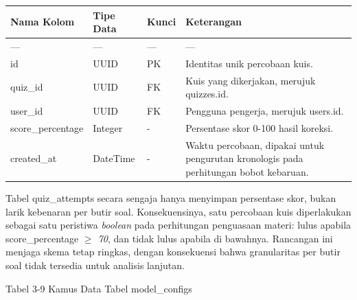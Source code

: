 \documentclass[12pt,a4paper]{article}
\begin{document}
\begin{table}[h]

\centering

\begin{tabular}{llll}

\toprule

Nama Kolom & Tipe Data & Kunci & Keterangan \\

\midrule

--- & --- & --- & --- \\

id & UUID & PK & Identitas unik percobaan kuis. \\

quiz\_id & UUID & FK & Kuis yang dikerjakan, merujuk quizzes.id. \\

user\_id & UUID & FK & Pengguna pengerja, merujuk users.id. \\

score\_percentage & Integer & - & Persentase skor 0-100 hasil koreksi. \\

created\_at & DateTime & - & Waktu percobaan, dipakai untuk pengurutan kronologis pada perhitungan bobot kebaruan. \\

\bottomrule

\end{tabular}

\end{table}

Tabel quiz\_attempts secara sengaja hanya menyimpan persentase skor, bukan larik kebenaran per butir soal. Konsekuensinya, satu percobaan kuis diperlakukan sebagai satu peristiwa \textit{boolean} pada perhitungan penguasaan materi: lulus apabila score\_percentage \textit{$\ge$ 70}, dan tidak lulus apabila di bawahnya. Rancangan ini menjaga skema tetap ringkas, dengan konsekuensi bahwa granularitas per butir soal tidak tersedia untuk analisis lanjutan.



Tabel 3-9	Kamus Data Tabel model\_configs
\end{document}
